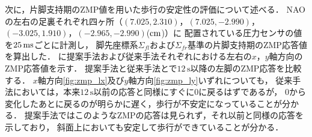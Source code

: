 \documentclass[autodetect-engine,dvipdfmx-if-dvi,ja=standard,a4j,jbase=11pt,magstyle=nomag*]{bxjsreport}
\begin{document}
次に，片脚支持期のZMP値を用いた歩行の安定性の評価について述べる．
NAOの左右の足裏それぞれ四ヶ所（$(7.025, 2.310)$，$(7.025, -2.990)$，$(-3.025, 1.910)$，$(-2.965, -2.990)$($\si{\centi\meter}$)）に
配置されている圧力センサの値を$25\,\si{\milli\second}$ごとに計測し，
脚先座標系$\Sigma_{fl}$および$\Sigma_{fr}$基準の片脚支持期のZMP応答値を算出した．
に提案手法および従来手法それぞれにおける左右の$x$，$y$軸方向のZMP応答値を示す．
提案手法と従来手法とで$12\,\mathrm{s}$以降の左脚のZMP応答を比較する．
$x$軸方向\cref{fig:zmp_lx}及び$y$軸方向\cref{fig:zmp_ly}いずれについても，
従来手法においては，本来$12\,\mathrm{s}$以前の応答と同様にすぐに$0$に戻るはずであるが，
$0$から変化したあとに戻るのが明らかに遅く，歩行が不安定になっていることが分かる．
提案手法ではこのようなZMPの応答は見られず，それ以前と同様の応答を示しており，
斜面上においても安定して歩行ができていることが分かる．

\end{document}
